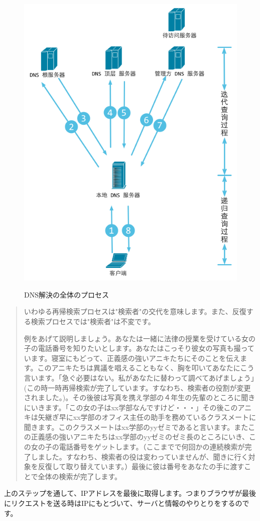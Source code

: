 \begin{figure}[H]
  \includegraphics[width=14cm]{3.1.dns_inquery.png}
   \label{図3.3}
   \caption{DNS解決の全体のプロセス}
\end{figure}


\begin{quote}
いわゆる再帰検索プロセスは"検索者"の交代を意味します。また、反復する検索プロセスでは"検索者"は不変です。

例をあげて説明しましょう。あなたは一緒に法律の授業を受けている女の子の電話番号を知りたいとします。あなたはこっそり彼女の写真も撮っています。寝室にもどって、正義感の強いアニキたちにそのことを伝えます。このアニキたちは異議を唱えることもなく、胸を叩いてあなたにこう言います。「急ぐ必要はない。私があなたに替わって調べてあげましょう」(この時一時再帰検索が完了しています。すなわち、検索者の役割が変更されました。)。その後彼は写真を携え学部の４年生の先輩のところに聞きにいきます。「この女の子はxx学部なんですけど・・・」その後このアニキは矢継ぎ早にxx学部のオフィス主任の助手を務めているクラスメートに聞きます。このクラスメートはxx学部のyyゼミであると言います。またこの正義感の強いアニキたちはxx学部のyyゼミのゼミ長のところにいき、この女の子の電話番号をゲットします。（ここまでで何回かの連続検索が完了しました。すなわち、検索者の役は変わっていませんが、聞きに行く対象を反復して取り替えています。）最後に彼は番号をあなたの手に渡すことで全体の検索が完了します。
\end{quote}

上のステップを通して、IPアドレスを最後に取得します。つまりブラウザが最後にリクエストを送る時はIPにもとづいて、サーバと情報のやりとりをするのです。


